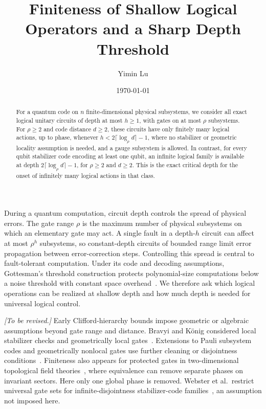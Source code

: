 \documentclass[aps,prl,reprint,notitlepage,nofootinbib,nobibnotes]{revtex4-2}
\begin{document}
\title{Finiteness of Shallow Logical Operators and a Sharp Depth Threshold}
\author{Yimin Lu}
\date{\today}

\begin{abstract}
For a quantum code on \(n\) finite-dimensional physical subsystems, we
consider all exact logical unitary circuits of depth at most \(h\ge1\), with
gates on at most \(\rho\) subsystems. For \(\rho\ge2\) and code distance
\(d\ge2\), these circuits have only finitely many logical actions, up to
phase, whenever \(h<2\lceil\log_{\rho} d\rceil-1\), where no stabilizer or geometric locality assumption is needed, and a gauge
subsystem is allowed. In contrast, for every qubit stabilizer code encoding at least one qubit, an infinite logical family is available at depth
\(2\lceil\log_{\rho} d\rceil-1\), for \(\rho\ge2\) and \(d\ge2\).
This is the exact critical depth for the onset of infinitely many
logical actions in that class.
\end{abstract}
\maketitle

During a quantum computation, circuit depth controls the spread of
physical errors. The gate range \(\rho\) is the maximum number of physical
subsystems on which an elementary gate may act. A single fault in a
depth-\(h\) circuit can affect at most \(\rho^h\) subsystems, so constant-depth
circuits of bounded range limit error propagation between
error-correction steps. Controlling this spread is central to
fault-tolerant computation. Under its code and decoding assumptions,
Gottesman's threshold construction protects polynomial-size
computations below a noise threshold with constant space
overhead~\cite{Gottesman}. We therefore ask which logical operations can
be realized at shallow depth and how much depth is needed for universal
logical control.

\textcolor{LinkDarkRed}{\textit{[To be revised.]}}\quad
Early Clifford-hierarchy bounds impose geometric or algebraic
assumptions beyond gate range and distance. Bravyi and K\"onig considered
local stabilizer checks and geometrically local gates~\cite{BK}.
Extensions to Pauli subsystem codes and geometrically nonlocal gates
use further cleaning or disjointness conditions~\cite{PY,JKY}.
Finiteness also appears for protected gates in two-dimensional
topological field theories~\cite{Beverland}, where equivalence can remove
separate phases on invariant sectors. Here only one global phase is
removed. Webster et al.\ restrict universal gate sets for
infinite-disjointness stabilizer-code families~\cite{Webster}, an
assumption not imposed here.
\end{document}
